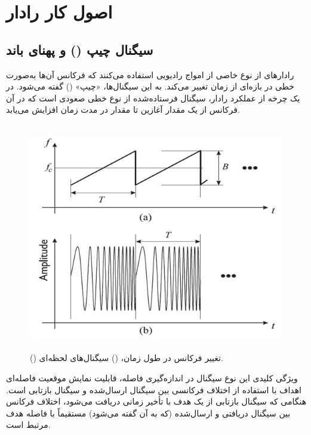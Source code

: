 \section{اصول کار رادار }\label{sec:fmcw-principles}


\subsection{سیگنال چیپ () و پهنای باند} %
\label{sec:chirp-bandwidth}

رادارهای  از نوع خاصی از امواج رادیویی استفاده می‌کنند که فرکانس آن‌ها به‌صورت خطی در بازه‌ای از زمان تغییر می‌کند. به این سیگنال‌ها، «چیپ» () گفته می‌شود. در یک چرخه از عملکرد رادار، سیگنال فرستاده‌شده از نوع خطی صعودی است که در آن فرکانس از یک مقدار آغازین  تا مقدار  در مدت زمان  افزایش می‌یابد.





\vspace{2cm}
\begin{center}
\begin{figure}[!h]
\includegraphics[height=10cm,width=12cm]{Images/chapter2/2-1.jpg}
\caption{() تغییر فرکانس در طول زمان، () سیگنال‌های  لحظه‌ای.
\cite{kebe2020human}
}
\end{figure}
\end{center}
\vspace{2cm}

ویژگی کلیدی این نوع سیگنال در اندازه‌گیری فاصله، قابلیت نمایش موقعیت فاصله‌ای اهداف با استفاده از اختلاف فرکانسی بین سیگنال ارسال‌شده و سیگنال بازتابی است. هنگامی که سیگنال بازتابی از یک هدف با تأخیر زمانی دریافت می‌شود، اختلاف فرکانس بین سیگنال دریافتی و ارسال‌شده (که به آن  گفته می‌شود) مستقیماً با فاصله هدف مرتبط است.


